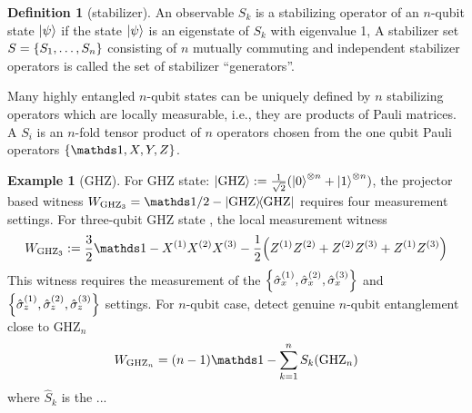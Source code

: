 \documentclass[
aps,
pra,
twocolumn,
floatfix,
]{revtex4-2}
\theoremstyle{plain}
\newtheorem{question}{Question}
\theoremstyle{definition}
\newtheorem{definition}{Definition}
\newtheorem{example}{Example}
\newcommand{\ew}{W}
\newcommand{\ghz}{\text{GHZ}}
\newcommand{\stbz}{\hat{S}}
\newcommand{\sx}{\hat{\sigma}_x}
\newcommand{\sz}{\hat{\sigma}_z}
\newcommand{\px}{X}
\newcommand{\pz}{Z}
\newcommand{\subgroup}{\mathbb{H}}
\begin{document}
\begin{definition}[stabilizer]\label{def:stabilizer}
	An observable $S_k$ is a stabilizing operator of an $n$-qubit state $\ket{\psi}$ if the state $\ket{\psi}$ is an eigenstate of $S_k$ with eigenvalue 1,
	A stabilizer set $S = \qty{ S_1, \dots , S_n}$ consisting of $n$ mutually commuting and independent stabilizer operators is called the set of stabilizer “generators”.
\end{definition}
Many highly entangled $n$-qubit states can be uniquely defined by $n$ stabilizing operators which are locally measurable, i.e., they are products of Pauli matrices.
A  $S_i$ is an $n$-fold tensor product of $n$ operators chosen from the one qubit Pauli operators $\qty{\identity,X,Y,Z}$.
\begin{example}[GHZ]\label{exm:ghz}
	For GHZ state: $\ket{\ghz}:=\frac{1}{\sqrt{2}}(\ket{0}^{\otimes n} + \ket{1}^{\otimes n} )$,
	the projector based witness 
	$\ew_{\ghz_3}=\identity/2 - \op{\ghz}$ 
	requires four measurement settings.
	For three-qubit GHZ state 
	\cite{tothDetectingGenuineMultipartite2005},
	the local measurement witness
	\begin{equation}
		\ew_{\ghz_3} := \frac{3}{2} \identity - \px^{(1)}\px^{(2)}\px^{(3)}
		- \frac{1}{2} \qty(
			\pz^{(1)} \pz^{(2)} + 
			\pz^{(2)} \pz^{(3)} + 
			\pz^{(1)} \pz^{(3)} 
		)
	\end{equation}
	This witness requires the measurement of the $\qty{\sx^{(1)},\sx^{(2)},\sx^{(3)}}$ and $\qty{\sz^{(1)},\sz^{(2)},\sz^{(3)}}$ settings.
	For $n$-qubit case, detect genuine $n$-qubit entanglement close to $\ghz_n$
	\begin{equation}
		\ew_{\ghz_n} = (n-1) \identity - \sum_{k=1}^n S_k{(\ghz_n)}
	\end{equation}
	where $\stbz_k$ is the  ... \cite{tothEntanglementDetectionStabilizer2005}	
\end{example}
\end{document}
